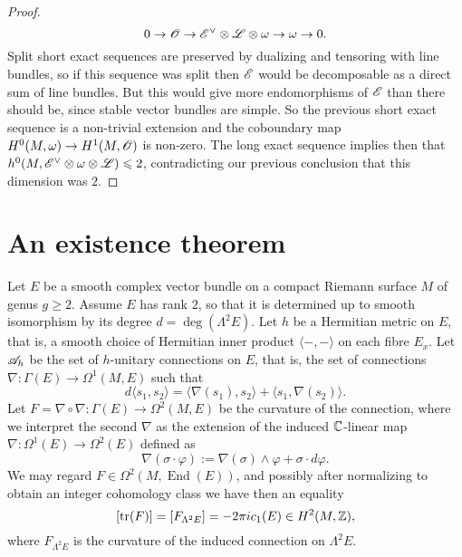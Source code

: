 \documentclass[A4paper, 12pt, british, reqno]{amsart}
\DeclareMathOperator{\End}{End}
\DeclareMathOperator{\tr}{tr}
\newcommand{\ot}{\otimes}
\newcommand{\dual}{^{\vee}}
\begin{document}
\begin{lm}
\begin{proof}
	\[ 0\to \O\to \E\dual\ot\L\ot\w\to \w\to 0. \]
	Split short exact sequences are preserved by dualizing and tensoring with line bundles, so if this sequence was split then $\mathscr{E}$ would be decomposable as a direct sum of line bundles.
	But this would give more endomorphisms of $\mathscr{E}$ than there should be, since stable vector bundles are simple.
	So the previous short exact sequence is a non-trivial extension and the coboundary map $H^{0}(M,\omega)\to H^{1}(M,\mathscr{O})$ is non-zero.
	The long exact sequence implies then that $h^{0}(M,\E\dual\ot \w\ot\L)\leqslant 2$, contradicting our previous conclusion that this dimension was $2$.
    \end{proof}
\end{lm}

\section{An existence theorem}

Let $E$ be a smooth complex vector bundle on a compact Riemann surface $M$ of genus $g\geqslant 2$.
Assume $E$ has rank $2$, so that it is determined up to smooth isomorphism by its degree $d=\deg(\Lambda^{2}E)$.
Let $h$ be a Hermitian metric on $E$, that is, a smooth choice of Hermitian inner product $\langle-,-\rangle$ on each fibre $E_{x}$.
Let $\mathscr{A}_{h}$ be the set of $h$-unitary connections on $E$, that is, the set of connections $\nabla\colon \Gamma(E)\to \Omega^{1}(M,E)$ such that
\[ d\langle s_{1},s_{2}\rangle=\langle \nabla(s_{1}),s_{2}\rangle + \langle s_{1},\nabla(s_{2})\rangle. \]
Let $F=\nabla\circ \nabla \colon \Gamma(E)\to \Omega^{2}(M,E)$ be the curvature of the connection, where we interpret the second $\nabla$ as the extension of the induced $\mathbb{C}$-linear map $\nabla\colon \Omega^{1}(E)\to \Omega^{2}(E)$ defined as
\[ \nabla(\sigma\cdot \varphi):=\nabla(\sigma)\wedge \varphi +\sigma \cdot d\varphi. \]
We may regard $F\in \Omega^{2}(M,\End(E))$, and possibly after normalizing to obtain an integer cohomology class we have then an equality
\[ [\tr(F)]=[F_{\Lambda^{2}E}]=-2\pi i c_{1}(E) \in H^{2}(M,\Z), \]
where $F_{\Lambda^{2}E}$ is the curvature of the induced connection on $\Lambda^{2}E$.





\vfill
\end{document}
